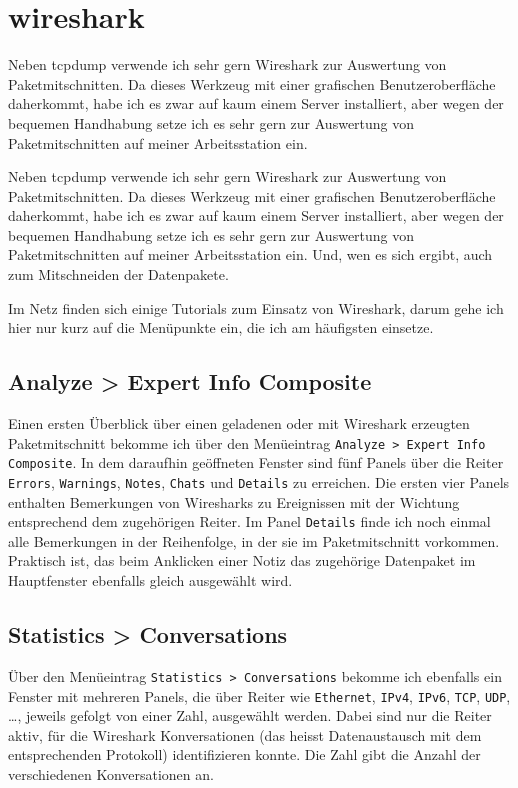 \section{wireshark}
\label{sec:netz-werkzeuge-wireshark}
\begin{abstractsec}
  Neben tcpdump verwende ich sehr gern Wireshark zur Auswertung von
  Paketmitschnitten. Da dieses Werkzeug mit einer grafischen
  Benutzeroberfläche daherkommt, habe ich es zwar auf kaum einem Server
  installiert, aber wegen der bequemen Handhabung setze ich es sehr gern zur
  Auswertung von Paketmitschnitten auf meiner Arbeitsstation ein.
\end{abstractsec}
\begin{normaltext}
  Neben tcpdump verwende ich sehr gern Wireshark zur Auswertung von
  Paketmitschnitten. Da dieses Werkzeug mit einer grafischen
  Benutzeroberfläche daherkommt, habe ich es zwar auf kaum einem Server
  installiert, aber wegen der bequemen Handhabung setze ich es sehr gern zur
  Auswertung von Paketmitschnitten auf meiner Arbeitsstation ein. Und, wen es
  sich ergibt, auch zum Mitschneiden der Datenpakete.

  Im Netz finden sich einige Tutorials zum Einsatz von Wireshark, darum gehe
  ich hier nur kurz auf die Menüpunkte ein, die ich am häufigsten einsetze.

  \subsection*{Analyze > Expert Info Composite}
  Einen ersten Überblick über einen geladenen oder mit Wireshark erzeugten
  Paketmitschnitt bekomme ich über den
  Menüeintrag \verb?Analyze > Expert Info Composite?.
  In dem daraufhin geöffneten Fenster sind fünf Panels über die Reiter
  \verb?Errors?, \verb?Warnings?, \verb?Notes?, \verb?Chats? und
  \verb?Details? zu erreichen. Die ersten vier Panels enthalten Bemerkungen
  von Wiresharks zu Ereignissen mit der Wichtung entsprechend dem zugehörigen
  Reiter. Im Panel \verb?Details? finde ich noch einmal alle Bemerkungen in
  der Reihenfolge, in der sie im Paketmitschnitt vorkommen. Praktisch ist, das
  beim Anklicken einer Notiz das zugehörige Datenpaket im Hauptfenster
  ebenfalls gleich ausgewählt wird.

  \subsection*{Statistics > Conversations}
  Über den Menüeintrag \verb?Statistics > Conversations? bekomme ich ebenfalls
  ein Fenster mit mehreren Panels, die über Reiter wie \verb?Ethernet?,
  \verb?IPv4?, \verb?IPv6?, \verb?TCP?, \verb?UDP?, \ldots, jeweils gefolgt
  von einer Zahl, ausgewählt werden. Dabei sind nur die Reiter aktiv, für die
  Wireshark Konversationen (das heisst Datenaustausch mit dem entsprechenden
  Protokoll) identifizieren konnte. Die Zahl gibt die Anzahl der verschiedenen
  Konversationen an.


\end{normaltext}
